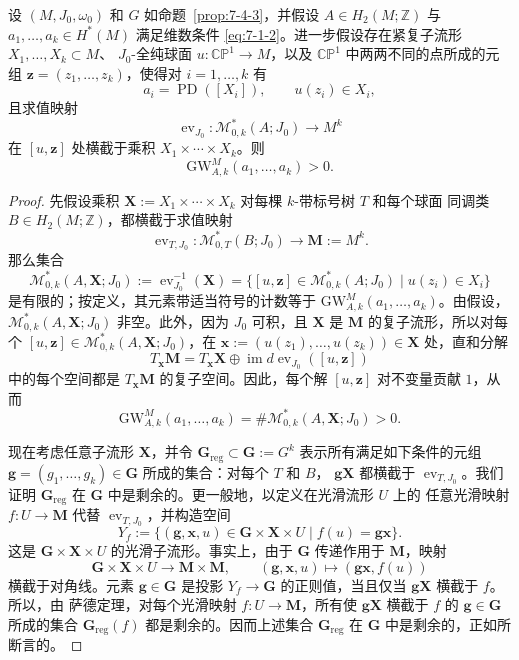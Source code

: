 \begin{proposition}\label{prop:7-4-5}
设 $(M,J_0,\omega_0)$ 和 $G$ 如命题~\ref{prop:7-4-3}，并假设
$A\in H_2(M;\mathbb Z)$ 与 $a_1,\ldots,a_k\in H^*(M)$ 满足维数条件
\eqref{eq:7-1-2}。进一步假设存在紧复子流形 $X_1,\ldots,X_k\subset M$、
$J_0$-全纯球面 $u:\mathbb{CP}^1\to M$，以及 $\mathbb{CP}^1$ 中两两不同的点所成的元组
$\mathbf z=(z_1,\ldots,z_k)$，使得对 $i=1,\ldots,k$ 有
\[
  a_i=\operatorname{PD}([X_i]),
  \qquad
  u(z_i)\in X_i,
\]
且求值映射
\[
  \operatorname{ev}_{J_0}:\mathcal M^*_{0,k}(A;J_0)\longrightarrow M^k
\]
在 $[u,\mathbf z]$ 处横截于乘积 $X_1\times\cdots\times X_k$。则
\[
  \mathrm{GW}^M_{A,k}(a_1,\ldots,a_k)>0.
\]
\end{proposition}

\begin{proof}
先假设乘积 $\mathbf X:=X_1\times\cdots\times X_k$ 对每棵 $k$-带标号树 $T$ 和每个球面
同调类 $B\in H_2(M;\mathbb Z)$，都横截于求值映射
\[
  \operatorname{ev}_{T,J_0}:\mathcal M^*_{0,T}(B;J_0)
  \longrightarrow\mathbf M:=M^k.
\]
那么集合
\[
  \mathcal M^*_{0,k}(A,\mathbf X;J_0)
  :=\operatorname{ev}_{J_0}^{-1}(\mathbf X)
  =\bigl\{[u,\mathbf z]\in\mathcal M^*_{0,k}(A;J_0)\mid
  u(z_i)\in X_i\bigr\}
\]
是有限的；按定义，其元素带适当符号的计数等于
$\mathrm{GW}^M_{A,k}(a_1,\ldots,a_k)$。由假设，
$\mathcal M^*_{0,k}(A,\mathbf X;J_0)$ 非空。此外，因为 $J_0$ 可积，且
$\mathbf X$ 是 $\mathbf M$ 的复子流形，所以对每个
$[u,\mathbf z]\in\mathcal M^*_{0,k}(A,\mathbf X;J_0)$，在
$\mathbf x:=(u(z_1),\ldots,u(z_k))\in\mathbf X$ 处，直和分解
\[
  T_{\mathbf x}\mathbf M
  =T_{\mathbf x}\mathbf X
   \oplus\operatorname{im}d\operatorname{ev}_{J_0}([u,\mathbf z])
\]
中的每个空间都是 $T_{\mathbf x}\mathbf M$ 的复子空间。因此，每个解
$[u,\mathbf z]$ 对不变量贡献 $1$，从而
\[
  \mathrm{GW}^M_{A,k}(a_1,\ldots,a_k)
  =\#\mathcal M^*_{0,k}(A,\mathbf X;J_0)>0.
\]

现在考虑任意子流形 $\mathbf X$，并令
$\mathbf G_{\mathrm{reg}}\subset\mathbf G:=G^k$ 表示所有满足如下条件的元组
$\mathbf g=(g_1,\ldots,g_k)\in\mathbf G$ 所成的集合：对每个 $T$ 和 $B$，
$\mathbf g\mathbf X$ 都横截于 $\operatorname{ev}_{T,J_0}$。我们证明
$\mathbf G_{\mathrm{reg}}$ 在 $\mathbf G$ 中是剩余的。更一般地，以定义在光滑流形 $U$ 上的
任意光滑映射 $f:U\to\mathbf M$ 代替 $\operatorname{ev}_{T,J_0}$，并构造空间
\[
  Y_f:=\bigl\{(\mathbf g,\mathbf x,u)\in
  \mathbf G\times\mathbf X\times U\mid f(u)=\mathbf g\mathbf x\bigr\}.
\]
这是 $\mathbf G\times\mathbf X\times U$ 的光滑子流形。事实上，由于 $\mathbf G$ 传递作用于
$\mathbf M$，映射
\[
  \mathbf G\times\mathbf X\times U\longrightarrow\mathbf M\times\mathbf M,
  \qquad
  (\mathbf g,\mathbf x,u)\longmapsto(\mathbf g\mathbf x,f(u))
\]
横截于对角线。元素 $\mathbf g\in\mathbf G$ 是投影 $Y_f\to\mathbf G$ 的正则值，当且仅当
$\mathbf g\mathbf X$ 横截于 $f$。所以，由 萨德定理，对每个光滑映射
$f:U\to\mathbf M$，所有使 $\mathbf g\mathbf X$ 横截于 $f$ 的
$\mathbf g\in\mathbf G$ 所成的集合 $\mathbf G_{\mathrm{reg}}(f)$ 都是剩余的。因而上述集合
$\mathbf G_{\mathrm{reg}}$ 在 $\mathbf G$ 中是剩余的，正如所断言的。


\end{proof}

